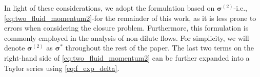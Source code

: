 In light of these considerations, we adopt the formulation based on $\bm \sigma^{(2)}$-i.e., \ref{eq:two_fluid_momentum2}-for the remainder of this work, as it is less prone to errors when considering the closure problem. 
Furthermore, this formulation is commonly employed in the analysis of non-dilute flows. 
For simplicity, we will denote $\bm \sigma^{(2)}$ as $\bm \sigma^{*}$ throughout the rest of the paper.
The last two terms on the right-hand side of \ref{eq:two_fluid_momentum2} can be further expanded into a Taylor series using \ref{eq:f_exp_delta}.
